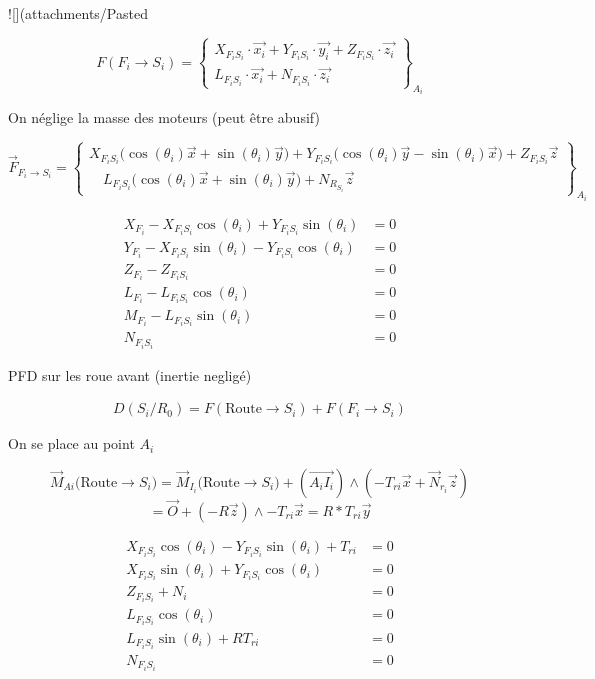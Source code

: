 \documentclass[a4paper,12pt]{report}  %
\begin{document}
![](attachments/Pasted%

$$
F(F_i \to S_i) = 
\begin{Bmatrix}
	X_{F_i S_i} \cdot \vec{x_i} + Y_{F_i S_i} \cdot \vec{y_i} + Z_{F_i S_i} \cdot \vec{z_i} \\
	L_{F_i S_i} \cdot \vec{x_i} + N_{F_i S_i} \cdot \vec{z_i}
\end{Bmatrix}_{A_{i}}
$$




On néglige la masse des moteurs (peut être abusif)


$$
\vec{F}_{F_i \to S_i} =
\left\{
\begin{array}{c}
	X_{F_iS_i} \big(\cos(\theta_i) \vec{x} + \sin(\theta_i) \vec{y} \big) 
	+  Y_{F_iS_i} \big(\cos(\theta_i) \vec{y} - \sin(\theta_i) \vec{x} \big)
	+ Z_{F_iS_i} \vec{z} \\[1em]
	\quad L_{F_iS_i} \big(\cos(\theta_i) \vec{x} + \sin(\theta_i) \vec{y} \big)  + N_{R_{S_i}} \vec{z}
\end{array}
\right\}_{A_i}
$$


\begin{align}
X_{F_i} - X_{F_iS_i} \cos(\theta_i) + Y_{F_iS_i} \sin(\theta_i) &= 0 \tag{7} \\
Y_{F_i} - X_{F_iS_i} \sin(\theta_i) - Y_{F_iS_i} \cos(\theta_i) &= 0 \tag{8} \\
Z_{F_i} - Z_{F_iS_i} &= 0 \tag{9} \\
L_{F_i} - L_{F_iS_i} \cos(\theta_i) &= 0 \tag{10} \\
M_{F_i} - L_{F_iS_i} \sin(\theta_i) &= 0 \tag{11} \\
N_{F_iS_i} &= 0 \tag{12}
\end{align}

PFD sur les roue avant (inertie negligé)

\begin{align}
D(S_i/R_0) = {F}(\text{Route} \rightarrow S_i) + {F}(F_i \rightarrow S_i) 
\end{align}

On se place au point $A_i$

$$
\vec{M}_{Ai}({\text{Route} \rightarrow S_i)} = \vec{M}_{I_i}({\text{Route}\rightarrow S_i)} + \left( \overrightarrow{A_iI_i} \right) \wedge (-{T}_{ri}\vec{x} + \vec{N}_{r_i} \vec{z})
$$
$$ = \vec{O} + ({-R}\vec{z})\wedge-T_{ri}\vec{x} = R *T_{ri}\vec{y}
$$


\begin{align}
		X_{F_iS_i} \cos(\theta_i) - Y_{F_iS_i} \sin(\theta_i) + T_{ri} &= 0 \tag{13} \\
		X_{F_iS_i}\sin(\theta_i) + Y_{F_iS_i} \cos(\theta_i)&= 0 \tag{14} \\
		Z_{F_iS_i} + N_i &= 0 \tag{15} \\
		L_{F_iS_i} \cos(\theta_i) &= 0 \tag{16} \\
		L_{F_iS_i} \sin(\theta_i) + R T_{ri} &= 0 \tag{17} \\
		N_{F_iS_i} &= 0 \tag{18}
\end{align}
\end{document}
